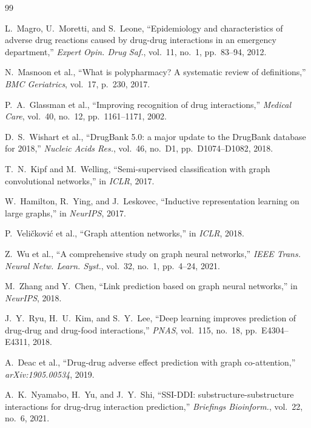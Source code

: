 \documentclass[10pt,twocolumn]{article}
\begin{document}
\twocolumn
\small
\begin{thebibliography}{99}

L.~Magro, U.~Moretti, and S.~Leone, ``Epidemiology and characteristics of
adverse drug reactions caused by drug-drug interactions in an emergency
department,'' \textit{Expert Opin. Drug Saf.}, vol.~11, no.~1, pp.~83--94,
2012.

N.~Masnoon et al., ``What is polypharmacy? A systematic review of definitions,''
\textit{BMC Geriatrics}, vol.~17, p.~230, 2017.

P.~A.~Glassman et al., ``Improving recognition of drug interactions,''
\textit{Medical Care}, vol.~40, no.~12, pp.~1161--1171, 2002.

D.~S.~Wishart et al., ``DrugBank 5.0: a major update to the DrugBank database
for 2018,'' \textit{Nucleic Acids Res.}, vol.~46, no.~D1,
pp.~D1074--D1082, 2018.

T.~N.~Kipf and M.~Welling, ``Semi-supervised classification with graph
convolutional networks,'' in \textit{ICLR}, 2017.

W.~Hamilton, R.~Ying, and J.~Leskovec, ``Inductive representation learning
on large graphs,'' in \textit{NeurIPS}, 2017.

P.~Veli\v{c}kovi\'{c} et al., ``Graph attention networks,''
in \textit{ICLR}, 2018.

Z.~Wu et al., ``A comprehensive study on graph neural networks,''
\textit{IEEE Trans. Neural Netw. Learn. Syst.}, vol.~32, no.~1,
pp.~4--24, 2021.

M.~Zhang and Y.~Chen, ``Link prediction based on graph neural networks,''
in \textit{NeurIPS}, 2018.

J.~Y.~Ryu, H.~U.~Kim, and S.~Y.~Lee, ``Deep learning improves prediction of
drug-drug and drug-food interactions,'' \textit{PNAS}, vol.~115, no.~18,
pp.~E4304--E4311, 2018.

A.~Deac et al., ``Drug-drug adverse effect prediction with graph co-attention,''
\textit{arXiv:1905.00534}, 2019.

A.~K.~Nyamabo, H.~Yu, and J.~Y.~Shi, ``SSI-DDI: substructure-substructure
interactions for drug-drug interaction prediction,''
\textit{Briefings Bioinform.}, vol.~22, no.~6, 2021.


\end{thebibliography}
\end{document}
